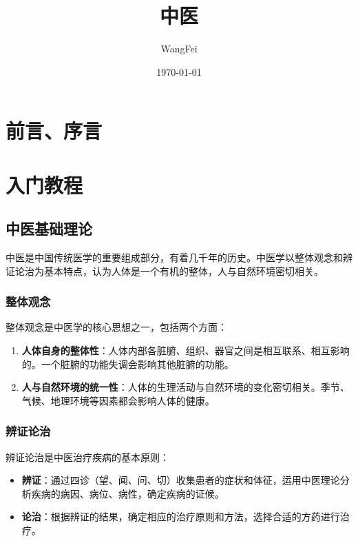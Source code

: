 \documentclass[12pt,UTF8]{ctexbook}
\title{\heiti\zihao{0} 中医}
\author{WangFei}
\date{\today}
\begin{document}
\maketitle
\tableofcontents

\frontmatter
\chapter{前言、序言}

\mainmatter

\chapter{入门教程}

\section{中医基础理论}

中医是中国传统医学的重要组成部分，有着几千年的历史。中医学以整体观念和辨证论治为基本特点，认为人体是一个有机的整体，人与自然环境密切相关。

\subsection{整体观念}

整体观念是中医学的核心思想之一，包括两个方面：

\begin{enumerate}
\item \textbf{人体自身的整体性}：人体内部各脏腑、组织、器官之间是相互联系、相互影响的。一个脏腑的功能失调会影响其他脏腑的功能。
\item \textbf{人与自然环境的统一性}：人体的生理活动与自然环境的变化密切相关。季节、气候、地理环境等因素都会影响人体的健康。
\end{enumerate}

\subsection{辨证论治}

辨证论治是中医治疗疾病的基本原则：

\begin{itemize}
\item \textbf{辨证}：通过四诊（望、闻、问、切）收集患者的症状和体征，运用中医理论分析疾病的病因、病位、病性，确定疾病的证候。
\item \textbf{论治}：根据辨证的结果，确定相应的治疗原则和方法，选择合适的方药进行治疗。
\end{itemize}
\end{document}
